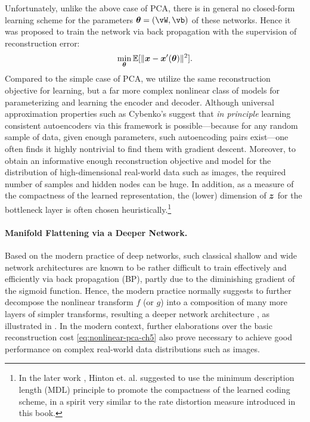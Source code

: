 \documentclass[../../book-main.tex]{subfiles}
\begin{document}
Unfortunately, unlike the above case of PCA, there is in general no
closed-form learning scheme for the parameters $\boldsymbol{\theta} =
(\vW, \vb)$ of these networks. Hence it was proposed to train the
network via back propagation with the supervision of reconstruction error:
\begin{equation}\label{eq:nonlinear-pca-ch5}
  \min_{\boldsymbol{\theta}} \mathbb{E}[ \|\bm{x} - \bm{x}'(\boldsymbol{\theta})\|^2].
\end{equation}
Compared to the simple case of PCA, we utilize the same reconstruction objective
for learning, but a far more complex nonlinear class of models for
parameterizing and learning the encoder and decoder. Although universal
approximation properties such as Cybenko's suggest that \textit{in principle}
learning consistent autoencoders via this framework is possible---because for
any random sample of data, given enough parameters, such autoencoding pairs
exist---one often finds it highly nontrivial to find them with gradient descent.
Moreover, to obtain an informative enough reconstruction objective
and model for the
distribution of high-dimensional real-world data such as images, the required
number of samples and hidden nodes can be huge.
In addition, as a measure of the compactness of the learned representation, the
(lower) dimension of $\bm{z}$ for the bottleneck layer is often chosen
heuristically.\footnote{In the later work \cite{Hinton-1993}, Hinton et.
  al. suggested to use the minimum description length (MDL) principle to promote
  the compactness of the learned coding scheme, in a spirit very similar to the
rate distortion measure introduced in this book.}

\paragraph{Manifold Flattening via a Deeper Network.}
Based on the modern practice of deep networks, such classical shallow
and wide network architectures are known to be rather difficult to
train effectively and efficiently via back propagation (BP), partly
due to the diminishing gradient of the sigmoid function. Hence, the
modern practice normally suggests to further
decompose the nonlinear transform $f$ (or $g$) into a composition of
many more layers of simpler transforms, resulting a deeper network architecture
\cite{Hinton504}, as illustrated in .
In the modern context, further elaborations over the basic reconstruction cost
\eqref{eq:nonlinear-pca-ch5} also prove necessary to achieve good performance on
complex real-world data distributions such as images.
\end{document}
